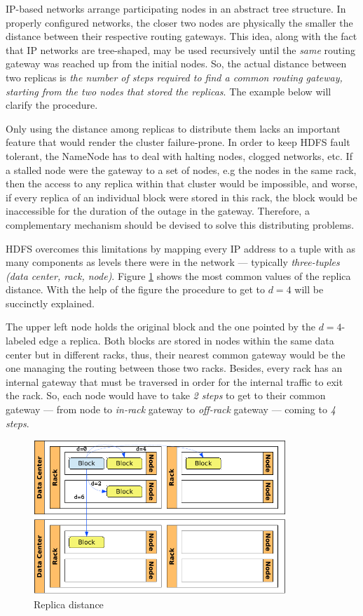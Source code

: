 IP-based networks arrange participating nodes in an abstract tree structure. In properly configured networks, the closer two nodes are physically the smaller the distance between their respective routing gateways. This idea, along with the fact that IP networks are tree-shaped, may be used recursively until the \emph{same} routing gateway was reached up from the initial nodes. So, the actual distance between two replicas is \emph{the number of steps required to find a common routing gateway, starting from the two nodes that stored the replicas}. The example below will clarify the procedure.

Only using the distance among replicas to distribute them lacks an important feature that would render the cluster failure-prone. In order to keep HDFS fault tolerant, the NameNode has to deal with halting nodes, clogged networks, etc. If a stalled node were the gateway to a set of nodes, e.g the nodes in the same rack, then the access to any replica within that cluster would be impossible, and worse, if every replica of an individual block were stored in this rack, the block would be inaccessible for the duration of the outage in the gateway. Therefore, a complementary mechanism should be devised to solve this distributing problems.

HDFS overcomes this limitations by mapping every IP address to a tuple with as many components as levels there were in the network --- typically \emph{three-tuples} \emph{(data center, rack, node)}. Figure \ref{fig:distnodos} shows the most common values of the replica distance. With the help of the figure the procedure to get to $d=4$ will be succinctly explained.

The upper left node holds the original block and the one pointed by the $d=4$-labeled edge a replica. Both blocks are stored in nodes within the same data center but in different racks, thus, their nearest common gateway would be the one managing the routing between those two racks. Besides, every rack has an internal gateway that must be traversed in order for the internal traffic to exit the rack. So, each node would have to take \emph{2 steps} to get to their common gateway --- from node to \emph{in-rack} gateway to \emph{off-rack} gateway --- coming to \emph{4 steps}.

\begin{figure}[tbp]
\begin{center}
\includegraphics[width=0.85\textwidth]{imagenes/018.pdf}
 \caption{Replica distance}
\label{fig:distnodos}
\end{center}
\end{figure}

